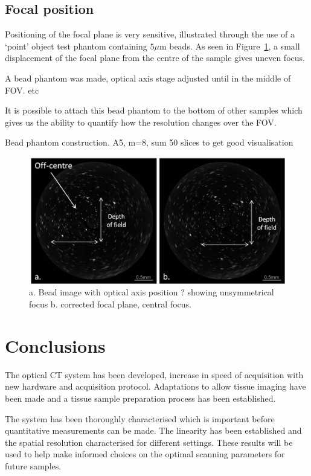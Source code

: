 \subsection{Focal position}
\label{sec:focalpos}

Positioning of the focal plane is very sensitive,  illustrated through the use of a `point' object test phantom containing $5 \mu$m beads. As seen in Figure~\ref{fig:bead_DOF}, a small displacement of the focal plane from the centre of the sample gives uneven focus. 

A bead phantom was made, optical axis stage adjusted until in the middle of FOV.  etc

It is possible to attach this  bead phantom to the bottom of other samples which gives us the ability to quantify  how the resolution changes over the FOV. 


Bead phantom construction. A5, m=8, sum 50 slices to get good visualisation

\begin{figure}
\centering
\includegraphics[width=\linewidth]{meth_img/focusing_beads.jpg}
\caption{a. Bead image with optical axis position ? showing unsymmetrical focus b. corrected focal plane, central focus.}
\label{fig:bead_DOF}
\end{figure}



\section{Conclusions}

The optical CT system has been developed, increase in speed of acquisition with new hardware and acquisition protocol. Adaptations to allow tissue imaging have been made and a tissue sample preparation process has been established. 

The system has been thoroughly characterised which is important before quantitative measurements can be made. The linearity has been established and the spatial resolution characterised for different settings. These results will be used to help make informed choices on the optimal scanning parameters for future samples. 

















